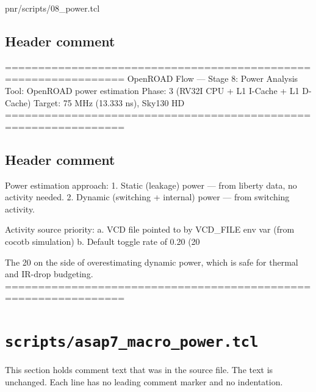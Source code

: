\begin{relocated}{pnr/scripts/08_power.tcl}

\subsection*{Header comment}

\begin{textblock}
================================================================
OpenROAD Flow — Stage 8: Power Analysis
Tool: OpenROAD power estimation
Phase: 3 (RV32I CPU + L1 I-Cache + L1 D-Cache)
Target: 75 MHz (13.333 ns), Sky130 HD
================================================================
\end{textblock}

\subsection*{Header comment}

\begin{textblock}
Power estimation approach:
  1. Static (leakage) power — from liberty data, no activity needed.
  2. Dynamic (switching + internal) power — from switching activity.

Activity source priority:
  a. VCD file pointed to by VCD_FILE env var (from cocotb simulation)
  b. Default toggle rate of 0.20 (20%

The 20%
on the side of overestimating dynamic power, which is safe for
thermal and IR-drop budgeting.
================================================================
\end{textblock}

\end{relocated}

\section{\texttt{scripts/asap7\_macro\_power.tcl}}\label{tm:pd:scripts-asap7-macro-power-tcl}

This section holds comment text that was in the source file. The text is unchanged. Each line has no leading comment marker and no indentation.

